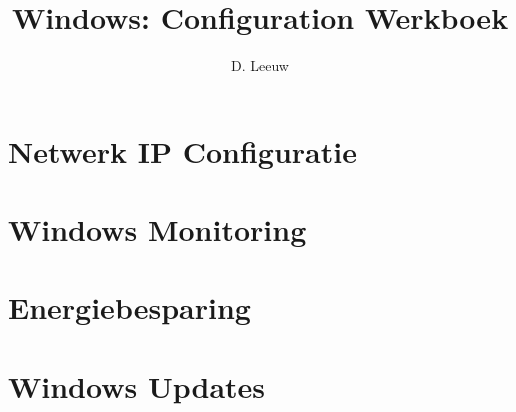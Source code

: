 \documentclass[a4paper,12pt,twoside,titlepage]{article}
\author{D. Leeuw}
\title{Windows: Configuration Werkboek}
\date{\today\\
0.0.0
\vfill
\raggedright
\copyright\ 2025-2026 Dennis Leeuw\\
}
\begin{document}

\maketitle



\section{Netwerk IP Configuratie}


\section{Windows Monitoring}


\section{Energiebesparing}


\section{Windows Updates}


\printindex
\end{document}
